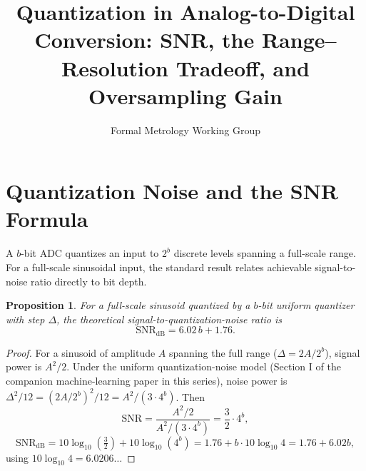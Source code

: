 \documentclass[10pt,journal,compsoc]{IEEEtran}
\newtheorem{proposition}{Proposition}
\begin{document}
\title{Quantization in Analog-to-Digital Conversion: SNR, the Range--Resolution Tradeoff, and Oversampling Gain}
\author{Formal Metrology Working Group}


\maketitle

\section{Quantization Noise and the SNR Formula}
A $b$-bit ADC quantizes an input to $2^b$ discrete levels spanning a full-scale range. For a full-scale sinusoidal input, the standard result relates achievable signal-to-noise ratio directly to bit depth.

\begin{proposition}
For a full-scale sinusoid quantized by a $b$-bit uniform quantizer with step $\Delta$, the theoretical signal-to-quantization-noise ratio is
\begin{equation}
    \mathrm{SNR}_{\mathrm{dB}} = 6.02\,b + 1.76.
\end{equation}
\end{proposition}
\begin{proof}
For a sinusoid of amplitude $A$ spanning the full range ($\Delta = 2A/2^b$), signal power is $A^2/2$. Under the uniform quantization-noise model (Section I of the companion machine-learning paper in this series), noise power is $\Delta^2/12 = (2A/2^b)^2/12 = A^2/(3\cdot 4^b)$. Then
\begin{equation}
    \mathrm{SNR} = \frac{A^2/2}{A^2/(3\cdot4^b)} = \frac{3}{2}\cdot 4^b,
\end{equation}
\begin{equation}
    \mathrm{SNR}_{\mathrm{dB}} = 10\log_{10}\!\left(\tfrac32\right) + 10\log_{10}(4^b) = 1.76 + b\cdot 10\log_{10}4 = 1.76+6.02b,
\end{equation}
using $10\log_{10}4 = 6.0206\ldots$
\end{proof}
\end{document}
